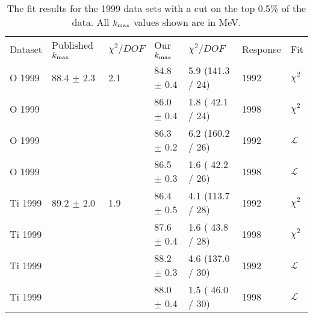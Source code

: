 
\begin{table}[h]
  \begin{center}
    \begin{tabular}{|l||l|l|l|l|l|l|}
      \hline
      Dataset & Published $\mbox{$k_{\rm max}$}$ & $\chi^2 / DOF$ & Our $\mbox{$k_{\rm max}$}$ & $\chi^2 / DOF$  & Response & Fit \\
      \hhline{|=||=|=|=|=|=|=|}

      O  1999 & 88.4 $\pm$ 2.3 & 2.1 & 84.8 $\pm$ 0.4 & 5.9 (141.3 / 24) & 1992 & $\chi^2$ \\
      O  1999 &                &     & 86.0 $\pm$ 0.4 & 1.8 ( 42.1 / 24) & 1998 & $\chi^2$ \\
      O  1999 &                &     & 86.3 $\pm$ 0.2 & 6.2 (160.2 / 26) & 1992 & $\mathcal{L}$ \\
      O  1999 &                &     & 86.5 $\pm$ 0.3 & 1.6 ( 42.2 / 26) & 1998 & $\mathcal{L}$ \\
      \hline                           
      Ti 1999 & 89.2 $\pm$ 2.0 & 1.9 & 86.4 $\pm$ 0.5 & 4.1 (113.7 / 28) & 1992 & $\chi^2$ \\
      Ti 1999 &                &     & 87.6 $\pm$ 0.4 & 1.6 ( 43.8 / 28) & 1998 & $\chi^2$ \\
      Ti 1999 &                &     & 88.2 $\pm$ 0.3 & 4.6 (137.0 / 30) & 1992 & $\mathcal{L}$ \\
      Ti 1999 &                &     & 88.0 $\pm$ 0.4 & 1.5 ( 46.0 / 30) & 1998 & $\mathcal{L}$ \\
      \hline                           
    \end{tabular}
  \end{center}
  \caption{The fit results for the 1999 data sets with a cut on the top 0.5\% of the data. All $\mbox{$k_{\rm max}$}$ values shown are in MeV.}
  \label{table:fits1999}
\end{table}


                                                                             
